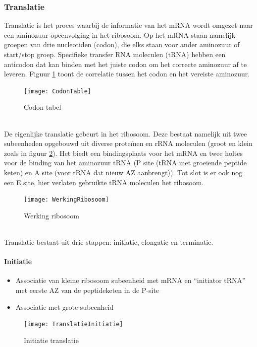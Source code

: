\documentclass[a4paper,kul]{kulakarticle} %
\begin{document}
\subsubsection{Translatie}
Translatie is het proces waarbij de informatie van het mRNA wordt omgezet naar een aminozuur-opeenvolging in het ribosoom. Op het mRNA staan namelijk groepen van drie nucleotiden (codon), die elks staan voor ander aminozuur of start/stop groep. Specifieke transfer RNA moleculen (tRNA) hebben een anticodon dat kan binden met het juiste codon om het correcte aminozuur af te leveren. Figuur \ref{fig:codontable} toont de correlatie tussen het codon en het vereiste aminozuur.
\begin{figure}[h]
	\centering
	\texttt{[image: CodonTable]}
	\caption[Codon Tabel]{Codon tabel}
	\label{fig:codontable}
\end{figure}\\
De eigenlijke translatie gebeurt in het ribosoom. Deze bestaat namelijk uit twee subeenheden opgebouwd uit diverse proteïnen en rRNA moleculen (groot en klein zoals in figuur \ref{fig:werkingribosoom}). Het biedt een bindingsplaats voor het mRNA en twee holtes voor de binding van het aminozuur tRNA (P site (tRNA met groeiende peptide keten) en A site (voor tRNA dat nieuw AZ aanbrengt)). Tot slot is er ook nog een E site, hier verlaten gebruikte tRNA moleculen het ribosoom. 
\begin{figure}[h]
	\centering
	\texttt{[image: WerkingRibosoom]}
	\caption[Werking ribosoom]{Werking ribosoom}
	\label{fig:werkingribosoom}
\end{figure}\\
\newpage
\noindent
Translatie bestaat uit drie stappen: initiatie, elongatie en terminatie. 
\paragraph{Initiatie}
\begin{itemize}
	\item Associatie van kleine ribosoom subeenheid met mRNA en “initiator tRNA” met eerste AZ van de peptideketen in de P-site
	\item Associatie met grote subeenheid
\end{itemize}
\begin{figure}[h]
	\centering
	\texttt{[image: TranslatieInitiatie]}
	\caption[Initiatie translatie]{Initiatie translatie}
	\label{fig:translatieinitiatie}
\end{figure}
\newpage
\end{document}
